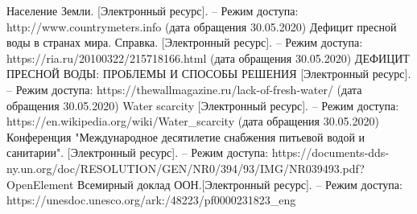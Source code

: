 \newpage
{}

\begin{thebibliography}{}
      Население Земли. [Электронный ресурс]. – Режим доступа: http://www.countrymeters.info (дата обращения 30.05.2020)
      Дефицит пресной воды в странах мира. Справка. [Электронный ресурс]. – Режим доступа:  https://ria.ru/20100322/215718166.html (дата обращения 30.05.2020)
      ДЕФИЦИТ ПРЕСНОЙ ВОДЫ: ПРОБЛЕМЫ И СПОСОБЫ РЕШЕНИЯ [Электронный ресурс]. – Режим доступа: 
    https://thewallmagazine.ru/lack-of-fresh-water/ (дата обращения 30.05.2020)
   Water scarcity [Электронный ресурс]. – Режим доступа:  https://en.wikipedia.org/wiki/Water\_scarcity (дата обращения 30.05.2020)
  Конференция "Международное десятилетие снабжения питьевой водой и санитарии". [Электронный ресурс]. – Режим доступа:  https://documents-dds-ny.un.org/doc/RESOLUTION/GEN/NR0/394/93/IMG/NR039493.pdf?OpenElement 
   Всемирный доклад ООН.[Электронный ресурс]. – Режим доступа: \\ https://unesdoc.unesco.org/ark:/48223/pf0000231823\_eng
\end{thebibliography}
